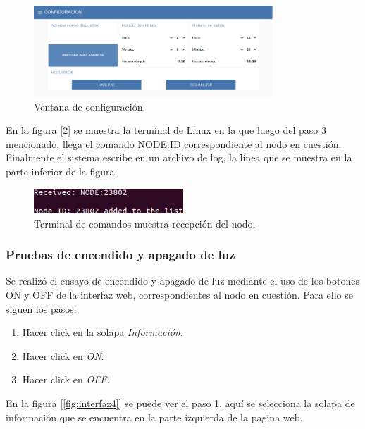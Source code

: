 \begin{figure}[ht!]
	\centering
	\includegraphics[width=0.8\textwidth]{./Figures/interfaz2.png}
	\caption{Ventana de configuración.}
	\label{fig:interfaz2}
\end{figure}

En la figura [\ref{fig:interfaz3}] se muestra la terminal de Linux en la que luego del paso 3 mencionado, llega el comando NODE:ID correspondiente al nodo en cuestión. Finalmente el sistema escribe en un archivo de log, la línea que se muestra en la parte inferior de la figura.

\begin{figure}[ht!]
	\centering
	\includegraphics[width=0.5\textwidth]{./Figures/interfaz3.png}
	\caption{Terminal de comandos muestra recepción del nodo.}
	\label{fig:interfaz3}
\end{figure}

\subsubsection{Pruebas de encendido y apagado de luz}

Se realizó el ensayo de encendido y apagado de luz mediante el uso de los botones ON y OFF de la interfaz web, correspondientes al nodo en cuestión. Para ello se siguen los pasos:

\begin{enumerate}
\item Hacer click en la solapa {\textit{Información}}.
\item Hacer click en {\textit{ON}}.
\item Hacer click en {\textit{OFF}}.
\end{enumerate}

En la figura [\ref{fig:interfaz4}] se puede ver el paso 1, aquí se selecciona la solapa de información que se encuentra en la parte izquierda de la pagina web.

